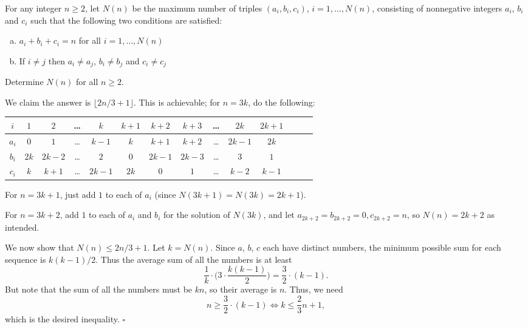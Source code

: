 
\begin{problem}[ISL 2009 C2]
    For any integer $n\geq 2$, let $N(n)$ be the maximum number of triples $(a_i, b_i, c_i)$, $i=1, \ldots, N(n)$, consisting of nonnegative integers $a_i$, $b_i$ and $c_i$ such that the following two conditions are satisfied: \begin{enumerate}[(a)]
        \item $a_i+b_i+c_i=n$ for all $i=1, \ldots, N(n)$
        \item If $i\neq j$ then $a_i\neq a_j$, $b_i\neq b_j$ and $c_i\neq c_j$
    \end{enumerate}
    Determine $N(n)$ for all $n\geq 2$.
\end{problem}

\begin{solution}
    We claim the answer is $\lfloor 2n/3 + 1 \rfloor$. This is achievable; for $n = 3k$, do the following:
    \begin{center}
    \begin{tabular}{c|c c c c c c c c c c c c c}
        $i$   & $1$ & $2$ & \ldots & $k$ & $k+1$ & $k+2$ & $k+3$ & \ldots & $2k$ & $2k+1$\\\hline
        $a_i$ & $0$ & $1$ & \ldots & $k-1$ & $k$ & $k+1$ & $k+2$ & \ldots & $2k-1$ & $2k$\\
        $b_i$ & $2k$ & $2k-2$ & \ldots & $2$ & $0$ & $2k-1$ & $2k-3$ & \ldots & $3$ & $1$\\
        $c_i$ & $k$ & $k+1$ & \ldots & $2k-1$ & $2k$ & $0$ & $1$ & \ldots & $k-2$ & $k-1$
    \end{tabular}
    \end{center}
    For $n = 3k+1$, just add $1$ to each of $a_i$ (since $N(3k+1) = N(3k) = 2k+1$).
    
    For $n = 3k+2$, add $1$ to each of $a_i$ and $b_i$ for the solution of $N(3k)$, and let $a_{2k+2} = b_{2k+2} = 0, c_{2k+2} = n$, so $N(n) = 2k+2$ as intended.
    
    We now show that $N(n) \leq 2n/3+1$. Let $k=N(n)$. Since $a$, $b$, $c$ each have distinct numbers, the minimum possible sum for each sequence is $k(k-1)/2$. Thus the average sum of all the numbers is at least \[\frac1k \cdot \bigg(3 \cdot \frac{k(k-1)}{2}\bigg) = \frac32 \cdot (k-1).\] But note that the sum of all the numbers must be $kn$, so their average is $n$. Thus, we need \[n \geq \frac32 \cdot (k-1) \Longleftrightarrow k \leq \frac23n+1,\] which is the desired inequality. $\square$
\end{solution}
